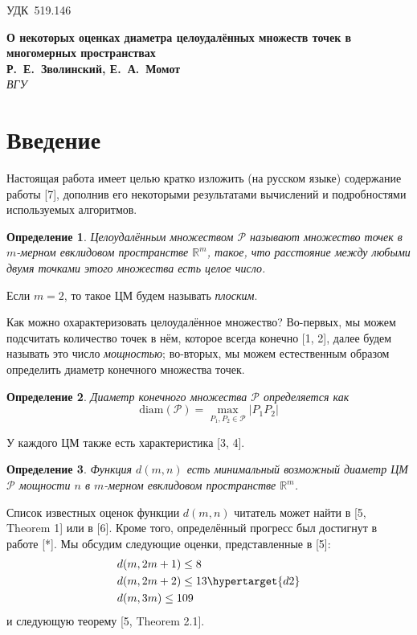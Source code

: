 \documentclass[12pt]{article}
\theoremstyle{theorem}
\theoremstyle{dfn}
\newtheorem{dfn}{Определение}
\theoremstyle{remark}
\begin{document}

\noindent УДК~519.146

\begin{center}
\textbf{О некоторых оценках диаметра целоудалённых множеств точек в многомерных пространствах} \\[3mm]
\textbf{Р.~Е.~Зволинский, Е.~А.~Момот} \\[2mm]
\emph{ВГУ}
\end{center}

\section{Введение}

Настоящая работа имеет целью кратко изложить (на русском языке) содержание работы [7], дополнив его некоторыми результатами
вычислений и подробностями используемых алгоритмов.


\begin{dfn}
	Целоудалённым множеством $\mathcal{P}$ называют множество точек в
	$m$-мерном евклидовом пространстве $\mathbb{R}^{m}$, такое, что расстояние
	между любыми двумя точками этого множества есть целое число.
\end{dfn}

Если $m = 2$, то такое ЦМ будем называть \textit{плоским}.

Как можно охарактеризовать целоудалённое множество?
Во-первых, мы можем подсчитать количество точек в нём,
которое всегда конечно [1, 2], далее будем называть это число \textit{мощностью};
во-вторых, мы можем естественным образом определить диаметр конечного множества точек.

\begin{dfn}
	Диаметр конечного множества $\mathcal{P}$ определяется как
	\begin{equation}
		\operatorname{diam(\mathcal{P})} = \underset{P_{1}, P_{2} \in
		\mathcal{P}}{\max} |P_{1}P_{2}|
	\end{equation}
\end{dfn}

У каждого ЦМ также есть характеристика
[3, 4].

\begin{dfn}
	Функция $d(m, n)$ есть минимальный возможный диаметр ЦМ $\mathcal{P}$ мощности $n$
	в $m$-мерном евклидовом пространстве $\mathbb{R}^{m}$.
\end{dfn}

Список известных оценок функции $d(m, n)$
читатель может найти в [5, Theorem 1] или в [6].
Кроме того, определённый прогресс был достигнут в работе [*]. %
Мы обсудим следующие оценки, представленные в [5]:
\begin{align}
	&d(m, 2m + 1) \leq 8\\
	&d(m, 2m + 2) \leq 13 \hypertarget{d2}\\
	&d(m, 3m) \leq 109
\end{align}
и следующую теорему [5, Theorem 2.1].
\end{document}
